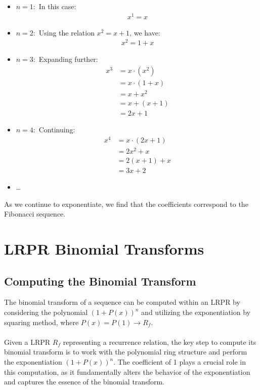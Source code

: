 \documentclass{article}
\theoremstyle{plain}
\begin{document}
\begin{itemize}
  \item \( n = 1: \) In this case:
  \begin{align*}
    x^1 = x
  \end{align*}
  \item \( n = 2: \) Using the relation \( x^2 = x + 1 \), we have: 
  \begin{align*}
    x^2 = 1 + x
  \end{align*}
  \item \( n = 3: \) Expanding further: 
  \begin{align*}
    x^3 &= x \cdot (x^2) \\ &= x \cdot (1 + x) \\ &= x + x^2  \\ &= x + (x + 1) \\ &= 2x + 1 
  \end{align*}
  \item \( n = 4: \) Continuing: 
  \begin{align*}
    x^4 &= x \cdot (2x + 1) \\ &= 2x^2 + x \\ &= 2(x + 1) + x \\ &= 3x + 2
  \end{align*}
  \item \dots
\end{itemize}

As we continue to exponentiate, we find that the coefficients correspond to the Fibonacci sequence.

\section{LRPR Binomial Transforms}

\subsection{Computing the Binomial Transform}

The binomial transform of a sequence can be computed within an LRPR by considering the polynomial \( (1 + P(x))^n \) and utilizing the exponentiation by squaring method, where \( P(x) = P(1) \rightarrow R_f\).
\\
\\
Given a LRPR \( R_f \) representing a recurrence relation, the key step to compute its binomial transform is to work with the polynomial ring structure and perform the exponentiation \( (1 + P(x))^n \). The coefficient of 1 plays a crucial role in this computation, as it fundamentally alters the behavior of the exponentiation and captures the essence of the binomial transform.
\end{document}
